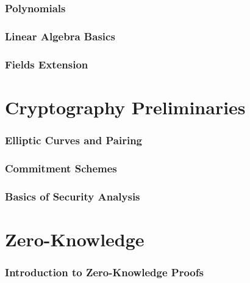 \documentclass{zkdl-template}
\begin{document}
    \section{Polynomials}\label{section:polynomial-rings}
    

    \section{Linear Algebra Basics}\label{section:linear-algebra}
    

    \section{Fields Extension}\label{section:finite-fields}
    


    \part{Cryptography Preliminaries}
    

    \section{Elliptic Curves and Pairing}\label{section:elliptic-curves}
    

    \section{Commitment Schemes}\label{section:commitment-schemes}
    

    \section{Basics of Security Analysis}\label{section:security-analysis}
    


    \part{Zero-Knowledge}
    

    \section{Introduction to Zero-Knowledge Proofs}\label{section:intro-zk}
    
\end{document}
